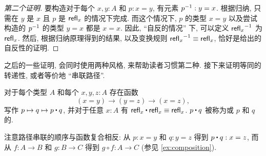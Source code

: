 \begin{proof}[第二个证明]
    要构造对于每个 $x,y:A$ 和 $p:x=y$, 有元素 $\mathord{{p}^{-1}}:y=x$.
    根据归纳, 只需在 $y$ 是 $x$ 且 $p$ 是 $\mathsf{refl}_{x}$ 的情况下完成.
    而这个情况下, $p$ 的类型 $x=y$ 以及尝试构造的 $\mathord{{p}^{-1}}$ 的类型 $y=x$ 都是 $x=x$.
    因此, ``自反的情况'' 下, 可以定义 $\mathord{{\mathsf{refl}_{x}}^{-1}}$ 为 $\mathsf{refl}_{x}$.
    然后, 根据归纳原理得到的结果, 以及变换规则 $\mathord{{\mathsf{refl}_{x}}^{-1}}\equiv\mathsf{refl}_{x}$, 恰好是给出的自反性的证明.
\end{proof}

之后的一些证明, 会同时使用两种风格, 来帮助读者习惯第二种.
接下来证明等同的转递性, 或者等价地 ``串联路径''.

\begin{lem}
    \label{lem:concat}
    对于每个类型 $A$ 和每个 $x,y,z:A$ 存在函数
    \begin{equation*}
    (x= y)
        \to (y= z)\to (x= z),
    \end{equation*}
    写作 $p \mapsto q \mapsto p\ct q$, 并对于任意 $x:A$ 有 $\refl{x}\ct \refl{x}\jdeq \refl{x}$.
    $p\ct q$ 被称为或 $p$ 和 $q$ 的.
\end{lem}

注意路径串联的顺序与函数复合相反: 从 $p:x=y$ 和 $q:y=z$ 得到 $p\ct q : x=z$, 而从 $f:A\to B$ 和 $g:B\to C$ 得到 $g\circ f : A\to C$ (参见 \cref{ex:composition}).

